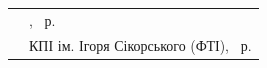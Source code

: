 {\begin{alwayssingle}
		\vfill
				
		
		\begin{flushleft}
			\begin{tabular}{p{\textwidth - 45ex}l}
				& \small\textcopyright\quad \authors, \the\year~р. \\
				& \small \textcopyright\quad КПІ ім. Ігоря Сікорського (ФТІ), \the\year~р.           
			\end{tabular}
		\end{flushleft}
		\newpage%
	\end{alwayssingle}
}





